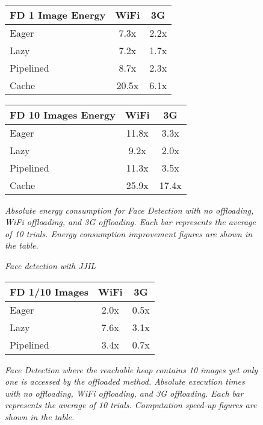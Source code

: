 \documentclass[10pt,journal,cspaper,compsoc]{IEEEtran}
\begin{document}
{\begin{figure*}
\centering
{}
\\
\begin{tabular}{|l|c|c|} \hline
\textbf{FD 1 Image Energy}&\textbf{WiFi}&\textbf{3G}\\ \hline
Eager &7.3x &2.2x\\ \hline
Lazy  &7.2x &1.7x\\ \hline
Pipelined   &8.7x &2.3x\\ \hline
Cache &20.5x      &6.1x\\
\hline\end{tabular}
\hspace{8 mm}
\begin{tabular}{|l|c|c|} \hline
\textbf{FD 10 Images Energy}&\textbf{WiFi}&\textbf{3G}\\ \hline
Eager &11.8x      &3.3x\\ \hline
Lazy  &9.2x &2.0x\\ \hline
Pipelined   &11.3x      &3.5x\\ \hline
Cache &25.9x      &17.4x\\
\hline\end{tabular}
\vspace{2 mm}
\caption{\small\textsl{Absolute energy consumption for Face Detection with no offloading, WiFi offloading, and 3G offloading. Each bar represents the average of 10 trials. Energy consumption improvement figures are shown in the table.}}
\label{fig:fd_energy}
\end{figure*}

\begin{figure}
\centering
{}
\caption{\small\textsl{Face detection with JJIL}}
\label{fig:two_faces}
\end{figure}



\begin{figure}
\centering
{}
\begin{tabular}{|l|c|c|} \hline
\textbf{FD 1/10 Images}&\textbf{WiFi}&\textbf{3G}\\ \hline
Eager &2.0x &0.5x\\ \hline
Lazy  &7.6x &3.1x\\ \hline
Pipelined &3.4x &0.7x\\
\hline\end{tabular}
\vspace{2 mm}
\caption{\small\textsl{Face Detection where the reachable heap contains 10 images yet only one is accessed by the offloaded method.  Absolute execution times with no offloading, WiFi offloading, and 3G offloading. Each bar represents the average of 10 trials. Computation speed-up figures are shown in the table.}}
\label{fig:fd_last_lazy}
\end{figure}


}
\end{document}

